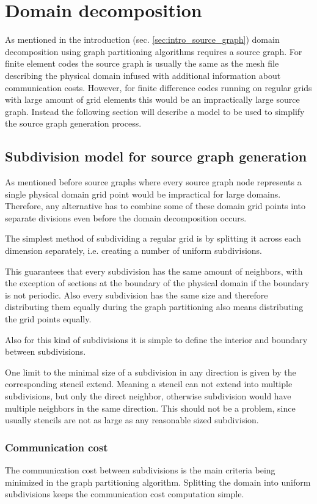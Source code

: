 \section{Domain decomposition}
As mentioned in the introduction (sec. \ref{sec:intro_source_graph}) domain decomposition using graph partitioning algorithms requires a source graph.
For finite element codes the source graph is usually the same as the mesh file describing the physical domain infused with additional information about communication costs.
However, for finite difference codes running on regular grids with large amount of grid elements this would be an impractically large source graph.
Instead the following section will describe a model to be used to simplify the source graph generation process.
\subsection{Subdivision model for source graph generation}
As mentioned before source graphs where every source graph node represents a single physical domain grid point would be impractical for large domains.
Therefore, any alternative has to combine some of these domain grid points into separate divisions even before the domain decomposition occurs.

The simplest method of subdividing a regular grid is by splitting it across each dimension separately, i.e. creating a number of uniform subdivisions.

This guarantees that every subdivision has the same amount of neighbors, with the exception of sections at the boundary of the physical domain if the boundary is not periodic.
Also every subdivision has the same size and therefore distributing them equally during the graph partitioning also means distributing the grid points equally.

Also for this kind of subdivisions it is simple to define the interior and boundary between subdivisions.

One limit to the minimal size of a subdivision in any direction is given by the corresponding stencil extend.
Meaning a stencil can not extend into multiple subdivisions, but only the direct neighbor, otherwise subdivision would have multiple neighbors in the same direction.
This should not be a problem, since usually stencils are not as large as any reasonable sized subdivision.

\subsubsection{Communication cost}
The communication cost between subdivisions is the main criteria being minimized in the graph partitioning algorithm.
Splitting the domain into uniform subdivisions keeps the communication cost computation simple.

